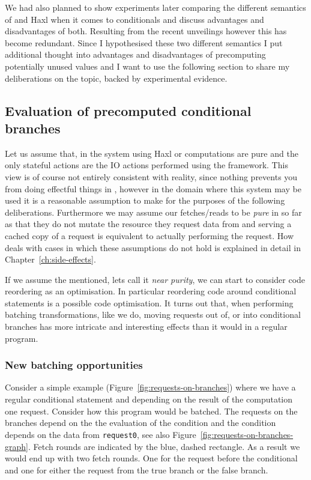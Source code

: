 We had also planned to show experiments later comparing the different semantics of \yauhau{} and Haxl when it comes to conditionals and discuss advantages and disadvantages of both.
Resulting from the recent unveilings however this has become redundant.
Since I hypothesised these two different semantics I put additional thought into advantages and disadvantages of precomputing potentially unused values and I want to use the following section to share my deliberations on the topic, backed by experimental evidence.


\subsection{Evaluation of precomputed conditional branches}

\label{sec:precomp-eval}

Let us assume that, in the system using Haxl or \yauhau{} computations are pure and the only stateful actions are the IO actions performed using the framework.
This view is of course not entirely consistent with reality, since nothing prevents you from doing effectful things in \yauhau{}, however in the domain where this system may be used it is a reasonable assumption to make for the purposes of the following deliberations.
Furthermore we may assume our fetches/reads to be \textit{pure} in so far as that they do not mutate the resource they request data from and serving a cached copy of a request is equivalent to actually performing the request.
How \yauhau{} deals with cases in which these assumptions do not hold is explained in detail in Chapter~\ref{ch:side-effects}.

If we assume the mentioned, lets call it \textit{near purity}, we can start to consider code reordering as an optimisation.
In particular reordering code around conditional statements is a possible code optimisation.
It turns out that, when performing batching transformations, like we do, moving requests out of, or into conditional branches has more intricate and interesting effects than it would in a regular program.

\subsubsection{New batching opportunities}

Consider a simple example (Figure~\ref{fig:requests-on-branches}) where we have a regular conditional statement and depending on the result of the computation one request.
Consider how this program would be batched.
The requests on the branches depend on the the evaluation of the condition and the condition depends on the data from \texttt{request0}, see also Figure~\ref{fig:requests-on-branches-graph}.
Fetch rounds are indicated by the blue, dashed rectangle.
As a result we would end up with two fetch rounds.
One for the request before the conditional and one for either the request from the true branch or the false branch.

